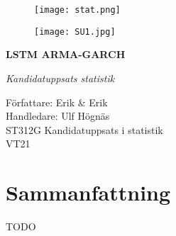 \documentclass[12pt]{article}
\begin{document}
\begin{titlepage}
\thispagestyle{empty}
	\begin{figure}[ht]
			\texttt{[image: stat.png]}
			
	   \endminipage
		 \texttt{[image: SU1.jpg]}
			
\endminipage
\end{figure}
	
	
\centering
\vspace{5cm}

{\large\bfseries LSTM ARMA-GARCH\par}
	\vspace{0.5cm}
	
{\large\itshape Kandidatuppsats statistik \par}
	\vfill
	
\begin{flushleft}
Författare: Erik \& Erik \\
Handledare: Ulf Högnäs\\
ST312G Kandidatuppsats i statistik \\
VT21
\end{flushleft}
\end{titlepage}


\newpage
\thispagestyle{empty}
\section*{Sammanfattning}
TODO

\newpage
\tableofcontents
\newpage

\begin{comment}
Hej igen!

Här kommer vårat först utkast. Säg gärna till när du tror att du har möjlighet att hunnit läsa igenom det och kan ta ett videomöte.

Det förekommer definitivt slarvel (formalia, ekvationer som har fel namn osv) men vi har inte prioriterat att fixa dessa just nu, utan tar det inför slutinlämningen (det lär ändå hinna ändras)

Två frågor vi vill skicka med är:
- Vad tycker du vi kan utveckla för att ta detta till nästa nivå? Det känns som vi har både tid och plats att göra något extra.
- En idé vi har är att simulera en trading-strategi likt http://cs230.stanford.edu/projects_winter_2020/reports/32066186.pdf, för att se vilken av modellerna som hade varit bäst att tradea med. Det ger också mer relaterbara resultat eftersom vi kan sätta ett pengavärde på hur bra modellerna presterar. Vad tror du om det?

Ser fram emot din feedback!

Allt gott,

Erik & Erik
\end{comment}
\end{document}
